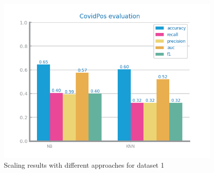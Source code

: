 \documentclass[10pt]{extarticle}
\begin{document}
\begin{figure}[H]
\includegraphics[scale=0.80]{images/dataset1/data_preparation/CovidPos_scaling_treat_Z-Score.png}
\caption{Scaling results with different approaches for dataset 1}
\end{figure}
\end{document}
